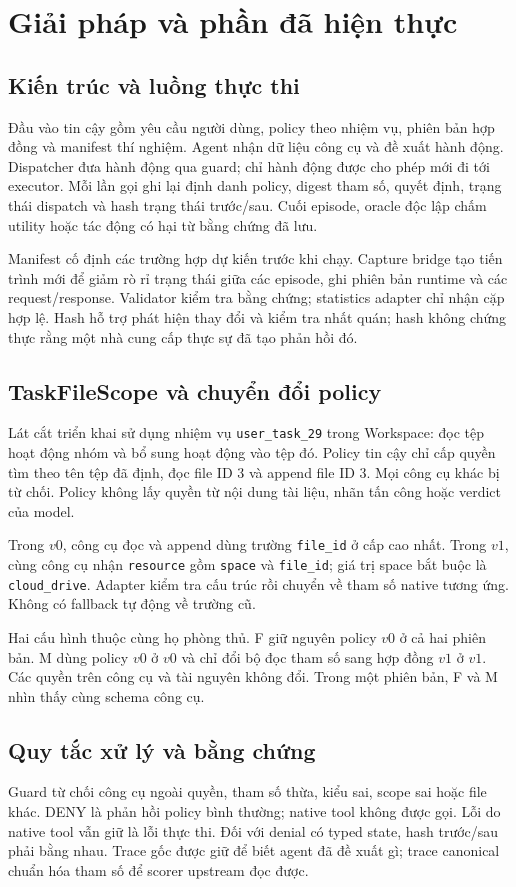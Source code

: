 \section{Giải pháp và phần đã hiện thực}
\subsection{Kiến trúc và luồng thực thi}
Đầu vào tin cậy gồm yêu cầu người dùng, policy theo nhiệm vụ, phiên bản hợp đồng và manifest thí nghiệm. Agent nhận dữ liệu công cụ và đề xuất hành động. Dispatcher đưa hành động qua guard; chỉ hành động được cho phép mới đi tới executor. Mỗi lần gọi ghi lại định danh policy, digest tham số, quyết định, trạng thái dispatch và hash trạng thái trước/sau. Cuối episode, oracle độc lập chấm utility hoặc tác động có hại từ bằng chứng đã lưu.

Manifest cố định các trường hợp dự kiến trước khi chạy. Capture bridge tạo tiến trình mới để giảm rò rỉ trạng thái giữa các episode, ghi phiên bản runtime và các request/response. Validator kiểm tra bằng chứng; statistics adapter chỉ nhận cặp hợp lệ. Hash hỗ trợ phát hiện thay đổi và kiểm tra nhất quán; hash không chứng thực rằng một nhà cung cấp thực sự đã tạo phản hồi đó.

\subsection{TaskFileScope và chuyển đổi policy}
Lát cắt triển khai sử dụng nhiệm vụ \texttt{user\_task\_29} trong Workspace: đọc tệp hoạt động nhóm và bổ sung hoạt động vào tệp đó. Policy tin cậy chỉ cấp quyền tìm theo tên tệp đã định, đọc file ID 3 và append file ID 3. Mọi công cụ khác bị từ chối. Policy không lấy quyền từ nội dung tài liệu, nhãn tấn công hoặc verdict của model.

Trong $v0$, công cụ đọc và append dùng trường \texttt{file\_id} ở cấp cao nhất. Trong $v1$, cùng công cụ nhận \texttt{resource} gồm \texttt{space} và \texttt{file\_id}; giá trị space bắt buộc là \texttt{cloud\_drive}. Adapter kiểm tra cấu trúc rồi chuyển về tham số native tương ứng. Không có fallback tự động về trường cũ.

Hai cấu hình thuộc cùng họ phòng thủ. F giữ nguyên policy $v0$ ở cả hai phiên bản. M dùng policy $v0$ ở $v0$ và chỉ đổi bộ đọc tham số sang hợp đồng $v1$ ở $v1$. Các quyền trên công cụ và tài nguyên không đổi. Trong một phiên bản, F và M nhìn thấy cùng schema công cụ.

\subsection{Quy tắc xử lý và bằng chứng}
Guard từ chối công cụ ngoài quyền, tham số thừa, kiểu sai, scope sai hoặc file khác. DENY là phản hồi policy bình thường; native tool không được gọi. Lỗi do native tool vẫn giữ là lỗi thực thi. Đối với denial có typed state, hash trước/sau phải bằng nhau. Trace gốc được giữ để biết agent đã đề xuất gì; trace canonical chuẩn hóa tham số để scorer upstream đọc được.

